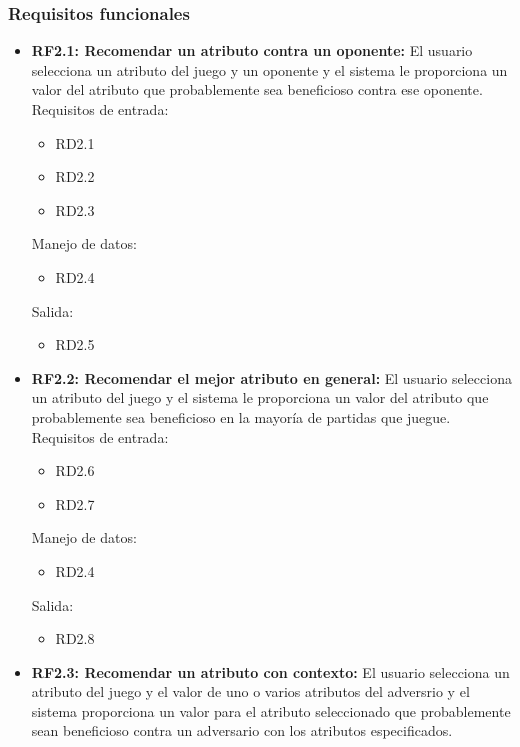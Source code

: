 \subsubsection{Requisitos funcionales}

	\begin{itemize}
		\item \textbf{RF2.1: Recomendar un atributo contra un oponente:} 
			El usuario selecciona un atributo del juego y un oponente y el
			sistema le proporciona un valor del atributo que probablemente
			sea beneficioso contra ese oponente.\\

			Requisitos de entrada:
			\begin{itemize}
				\item RD2.1 %
				\item RD2.2 %
				\item RD2.3 %
			\end{itemize}
			Manejo de datos:
			\begin{itemize}
				\item RD2.4 %
			\end{itemize}
			Salida:
			\begin{itemize}
				\item RD2.5 %
			\end{itemize}

		\item \textbf{RF2.2: Recomendar el mejor atributo en general:}
			El usuario selecciona un atributo del juego y el sistema le
			proporciona un valor del atributo que probablemente sea
			beneficioso en la mayoría de partidas que juegue.\\

			Requisitos de entrada:
			\begin{itemize}
				\item RD2.6 %
				\item RD2.7 %
			\end{itemize}
			Manejo de datos:
			\begin{itemize}
				\item RD2.4 %
			\end{itemize}
			Salida:
			\begin{itemize}
				\item RD2.8 %
			\end{itemize}

		\item \textbf{RF2.3: Recomendar un atributo con contexto:}
			El usuario selecciona un atributo del juego y
			el valor de uno o varios atributos del adversrio y el sistema
			proporciona un valor para el atributo seleccionado que
			probablemente sean beneficioso contra un adversario con
			los atributos especificados.\\


\end{itemize}
